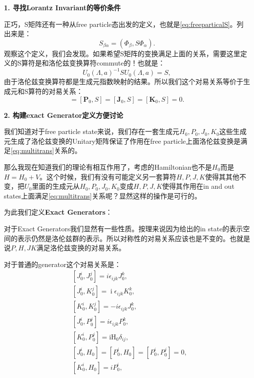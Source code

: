 \textbf{1. 寻找Lorantz Invariant的等价条件}

正巧，S矩阵还有一种从free particle态出发的定义，也就是\cref{eq:freeparticalS}。列出来是：
\begin{equation}
  S_{\beta\alpha}=(\Phi_\beta,S\Phi_\alpha).
  \label{eq:freepariticalS2}
\end{equation}
观察这个定义，我们会发现。如果希望S矩阵的变换满足上面的关系，需要这里定义的S算符是和洛伦兹变换算符commute的！也就是：
\begin{equation}
  U_0(\Lambda,a)^{-1}SU_0(\Lambda,a)=S,
  \label{eq:Scommute}
\end{equation}
由于洛伦兹变换算符都是生成元指数映射的结果。所以我们这个对易关系等价于生成元和S算符的对易关系：
\begin{equation}
  [H_0,S]=[\mathbf{P}_0,S]=[\mathbf{J}_0,S]=[\mathbf{K}_0,S]=0.
  \label{eq:Scommutegenerator}
\end{equation}

\textbf{2. 构建exact Generator定义方便讨论}

我们知道对于free particle state来说，我们存在一套生成元$H_0, P_0,J_0,K_0$这些生成元生成了洛伦兹变换的Unitary矩阵保证了作用在free particle上面洛伦兹变换是满足\cref{eq:multitrans}关系的。

那么我现在知道我们的理论有相互作用了，考虑的Hamiltonian也不是$H_0$而是$H = H_0 +V$。这个时候，我们有没有可能定义另一套算符$H,P,J,K$使得其其他不变，把$U_0$里面的生成元从$H_0,P_0,J_0,K_0$变成$H,P,J,K$使得其作用在in and out states上面满足\cref{eq:multitrans}关系呢？显然这样的操作是可行的。


为此我们定义\textbf{Exact Generators}：

  
对于Exact Generators我们显然有一些性质。按理来说因为给出的in state的表示空间的表示仍然是洛伦兹群的表示。所以对称性的对易关系应该也是不变的。也就是说$P, H,J K$满足洛伦兹变换的对易关系。

对于普通的generator这个对易关系是：
\begin{equation}
  \begin{aligned}
  &[J_0^i,J_0^j]=i\epsilon_{ijk}J_0^k,\\
  &[J_0^i,K_0^j]=\operatorname{i}\epsilon_{ijk}K_0^k,\\
  &[K_0^i,K_0^j]=-i\epsilon_{ijk}J_0^k,\\
  &[J_0^i,P_0^j]=i\epsilon_{ijk}P_0^k,\\
  &[K_0^i,P_0^j]=\mathrm{iH}_0\delta_{ij},\\
  &[J_0^i,H_0]=[P_0^i,H_0]=[P_0^i,P_0^j]=0,\\
  &[K_0^i,H_0]=iP_0^i,
  \end{aligned}
  \label{eq:commutenormal}
\end{equation}

